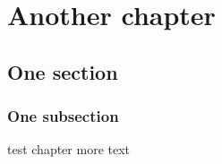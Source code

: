 \documentclass[../main.tex]{subfiles}
\begin{document}
\chapter{Another chapter}

\lipsum[7]

\section{One section}

\lipsum[3]

\subsection{One subsection}

\lipsum[3]
test chapter more text
\end{document}
